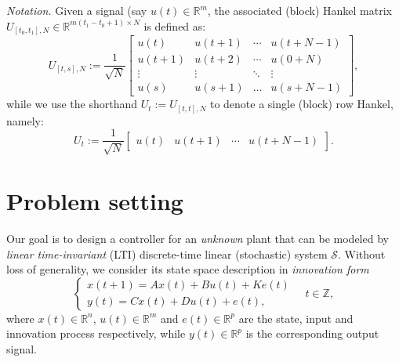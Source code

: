 \documentclass[letterpaper, 10 pt, conference]{ieeeconf}  %
\begin{document}
\textit{Notation.} Given a signal (say $u(t) \in \mathbb{R}^m$, the associated (block) Hankel matrix $U_{[t_0,t_1],N} \in \mathbb{R}^{m(t_1-t_0+1) \times N}$ is defined as:
\begin{equation}\label{eq:Hankel}
	U_{[t,s],N}\!:=\!\!\frac{1}{\sqrt{N}}\!\begin{bmatrix}
		u(t) & u(t\!+\!1) & \cdots & u(t\!+\!N\!-\!1)\\
		u(t\!+\!1) & u(t\!+\!2) & \cdots & u(0\!+\!N)\\
		\vdots & \vdots & \ddots & \vdots\\
		u(s) &u(s\!+\!1) & \dots & u(s\!+\!N\!-\!1)  
	\end{bmatrix}\!\!,
\end{equation}
while we use the shorthand $U_{t}:= U_{[t,t],N}$ to denote a single (block) row Hankel, namely:
\begin{equation}\label{eq:Hankel:onerow}
	U_{t}:= \frac{1}{\sqrt{N}}\begin{bmatrix}
		u(t) & u(t\!+\!1) & \cdots & u(t\!+\!N\!-\!1)
	\end{bmatrix}. 
\end{equation}

\section{Problem setting}\label{sec:setting}
Our goal is to design a controller for an 
\emph{unknown} plant that can be modeled by \emph{linear time-invariant} (LTI) discrete-time linear (stochastic) system $\mathcal{S}$.  Without loss of generality, we consider its state space description  in 
%
%
\emph{innovation form}
\begin{equation}\label{eq:stoc_sys}
	\begin{cases}
		x(t+1)=Ax(t)+Bu(t)+Ke(t)\\
		y(t)=Cx(t)+Du(t)+e(t), 	\end{cases} \quad  t \in \mathbb{Z},
\end{equation}
where $x(t)\in \mathbb{R}^{n}$, $u(t) \in \mathbb{R}^{m}$ and $e(t) \in \mathbb{R}^{p}$ are the state, input and  innovation process  respectively, while $y(t) \in \mathbb{R}^{p}$ is the corresponding output signal.
\end{document}

